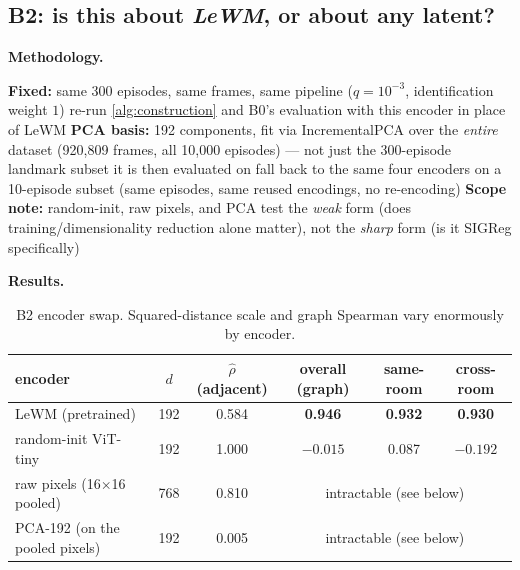 \documentclass[11pt]{article}
\begin{document}
\subsection{B2: is this about \emph{LeWM}, or about any latent?}
\label{sec:b2-results}

\textbf{Methodology.}

\begin{algorithm}[H]
\caption{B2 methodology}
\begin{algorithmic}[1]
\State \textbf{Fixed:} same 300 episodes, same frames, same pipeline ($q=10^{-3}$, identification weight $1$)
    \State re-run \cref{alg:construction} and B0's evaluation with this encoder in place of LeWM
\EndFor
\State \textbf{PCA basis:} 192 components, fit via IncrementalPCA over the \emph{entire} dataset (920{,}809 frames, all 10{,}000 episodes) --- not just the 300-episode landmark subset it is then evaluated on
    \State fall back to the same four encoders on a 10-episode subset (same episodes, same reused encodings, no re-encoding) 
\EndIf
\State \textbf{Scope note:} random-init, raw pixels, and PCA test the \emph{weak} form (does training/dimensionality reduction alone matter), not the \emph{sharp} form (is it SIGReg specifically) 
\end{algorithmic}
\end{algorithm}

\textbf{Results.}

\begin{table}[h]
\centering
\caption{B2 encoder swap. Squared-distance scale and graph Spearman vary enormously by encoder.}
\begin{tabular}{lccccc}
\toprule
encoder & $d$ & $\hat\rho$ (adjacent) & overall (graph) & same-room & cross-room \\
\midrule
LeWM (pretrained)        & 192 & 0.584 & \textbf{0.946} & \textbf{0.932} & \textbf{0.930} \\
random-init ViT-tiny     & 192 & 1.000 & $-0.015$        & 0.087          & $-0.192$ \\
raw pixels (16$\times$16 pooled) & 768 & 0.810 & \multicolumn{3}{c}{intractable (see below)} \\
PCA-192 (on the pooled pixels) & 192 & 0.005 & \multicolumn{3}{c}{intractable (see below)} \\
\bottomrule
\end{tabular}
\end{table}
\end{document}
